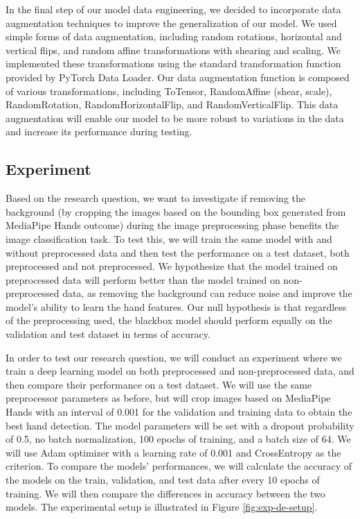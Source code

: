 \documentclass[a4paper]{article}
\begin{document}
In the final step of our model data engineering, we decided to incorporate data augmentation techniques to improve the generalization of our model. We used simple forms of data augmentation, including random rotations, horizontal and vertical flips, and random affine transformations with shearing and scaling. We implemented these transformations using the standard transformation function provided by PyTorch Data Loader. Our data augmentation function is composed of various transformations, including ToTensor, RandomAffine (shear, scale), RandomRotation, RandomHorizontalFlip, and RandomVerticalFlip. This data augmentation will enable our model to be more robust to variations in the data and increase its performance during testing.

\subsection{Experiment}

Based on the research question, we want to investigate if removing the background (by cropping the images based on the bounding box generated from MediaPipe Hands outcome) during the image preprocessing phase benefits the image classification task. To test this, we will train the same model with and without preprocessed data and then test the performance on a test dataset, both preprocessed and not preprocessed. We hypothesize that the model trained on preprocessed data will perform better than the model trained on non-preprocessed data, as removing the background can reduce noise and improve the model's ability to learn the hand features. Our null hypothesis is that regardless of the preprocessing used, the blackbox model should perform equally on the validation and test dataset in terms of accuracy.



In order to test our research question, we will conduct an experiment where we train a deep learning model on both preprocessed and non-preprocessed data, and then compare their performance on a test dataset. We will use the same preprocessor parameters as before, but will crop images based on MediaPipe Hands with an interval of 0.001 for the validation and training data to obtain the best hand detection. The model parameters will be set with a dropout probability of 0.5, no batch normalization, 100 epochs of training, and a batch size of 64. We will use Adam optimizer with a learning rate of 0.001 and CrossEntropy as the criterion. To compare the models' performances, we will calculate the accuracy of the models on the train, validation, and test data after every 10 epochs of training. We will then compare the differences in accuracy between the two models. The experimental setup is illustrated in Figure \ref{fig:exp-de-setup}.
\end{document}
